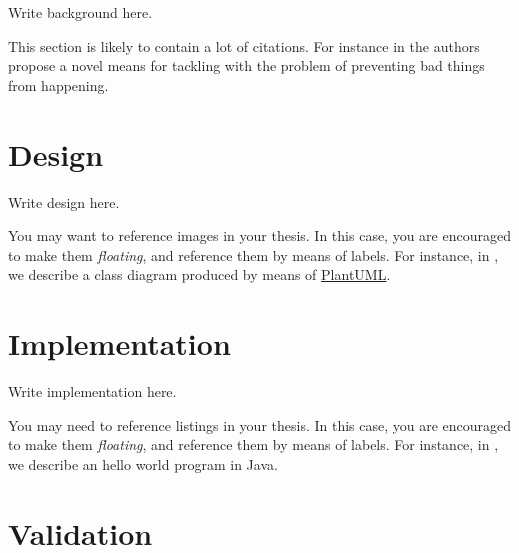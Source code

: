\documentclass[12pt,a4paper,openright,twoside]{book}
\begin{document}
Write background here.

This section is likely to contain a lot of citations.
%
For instance in \cite{AnzengruberSocInfo2013} the authors propose a novel means for tackling with the problem of preventing bad things from happening.

\chapter{Design} %
\label{chap:design}

Write design here.


You may want to reference images in your thesis.
%
In this case, you are encouraged to make them \emph{floating}, and reference them by means of labels.
%
For instance, in , we describe a class diagram produced by means of \href{http://plantuml.com}{PlantUML}.

\chapter{Implementation} %
\label{chap:implementation}

Write implementation here.

%

You may need to reference listings in your thesis.
%
In this case, you are encouraged to make them \emph{floating}, and reference them by means of labels.
%
For instance, in , we describe an hello world program in Java.

\chapter{Validation} %
\label{chap:validation}
\end{document}
